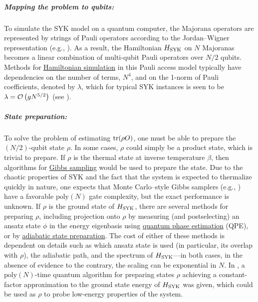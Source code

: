 \begin{refsection}
\subparagraph{Mapping the problem to qubits:} 
To simulate the SYK model on a quantum computer, the Majorana operators are represented by strings of Pauli operators according to the Jordan--Wigner representation (e.g., \cite{garcia-alvarez2017}). As a result, the Hamiltonian $H_{\rm SYK}$ on $N$ Majoranas becomes a linear combination of multi-qubit Pauli operators over $N/2$ qubits. Methods for \hyperref[prim:HamiltonianSimulation]{Hamiltonian simulation} in this Pauli access model typically have dependencies on the number of terms, $N^4$, and on the 1-norm of Pauli coefficients, denoted by $\lambda$, which for typical SYK instances is seen to be $\lambda = \mathcal{O}\left( gN^{5/2} \right)$ (see \cite[Eq.~(16)]{babbush2019SYKmodel}). 


\subparagraph{State preparation:} 

To solve the problem of estimating $\text{tr}(\rho O)$, one must be able to prepare the $(N/2)$-qubit state $\rho$. In some cases, $\rho$ could simply be a product state, which is trivial to prepare. If $\rho$ is the thermal state at inverse temperature $\beta$, then algorithms for \hyperref[prim:GibbsSampling]{Gibbs sampling} would be used to prepare the state. Due to the chaotic properties of SYK and the fact that the system is expected to thermalize quickly in nature, one expects that Monte Carlo--style Gibbs samplers (e.g., \cite{temme2011quantumMetropolis,chen2021fastThermalization, Shtanko2021AlgorithmsforGibbs, Rall_thermal_22,chen2023QThermalStatePrep}) have a favorable $\mathrm{poly}(N)$ gate complexity, but the exact performance is unknown. If $\rho$ is the ground state of $H_{\rm SYK}$, there are several methods for preparing $\rho$, including projection onto $\rho$ by measuring (and postselecting) an ansatz state $\phi$ in the energy eigenbasis using \hyperref[prim:QPE]{quantum phase estimation} (QPE), or by \hyperref[prim:QuantumAdiabaticAlgorithm]{adiabatic state preparation}. The cost of either of these methods is dependent on details such as which ansatz state is used (in particular, its overlap with $\rho$), the adiabatic path, and the spectrum of $H_{\rm SYK}$---in both cases, in the absence of evidence to the contrary, the scaling can be exponential in $N$. In \cite{hastings2022optimizing}, a $\mathrm{poly}(N)$-time quantum algorithm for preparing states $\rho$ achieving a constant-factor approximation to the ground state energy of $H_{\rm SYK}$ was given, which could be used as $\rho$ to probe low-energy properties of the system.


\end{refsection}
